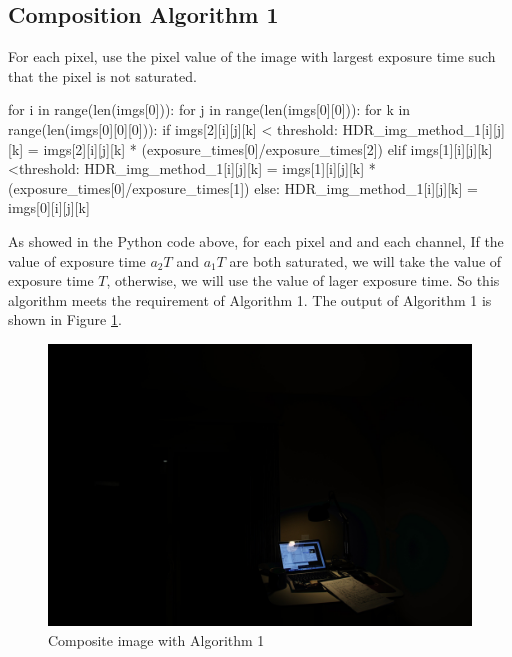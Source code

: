 \documentclass[10pt,twocolumn,letterpaper]{article}
\begin{document}
\subsection{Composition Algorithm 1}
For each pixel, use the pixel value of the image with largest exposure time such that the pixel is not saturated. \\

\begin{python}
for i in  range(len(imgs[0])):
	for j in range(len(imgs[0][0])):
		for k in range(len(imgs[0][0][0])):
			if imgs[2][i][j][k] < threshold:
				HDR_img_method_1[i][j][k] 
				= imgs[2][i][j][k] * 
				(exposure_times[0]/exposure_times[2])
			elif imgs[1][i][j][k] <threshold:
				HDR_img_method_1[i][j][k] 
				= imgs[1][i][j][k] * 
				(exposure_times[0]/exposure_times[1])
			else:
				HDR_img_method_1[i][j][k] 
				= imgs[0][i][j][k]
\end{python}

As showed in the Python code above, for each pixel and and each channel, If the value of exposure time $a_{2}T$ and $a_{1}T$ are both saturated, we will take the value of exposure time $T$, otherwise, we will use the value of lager exposure time. So this algorithm meets the requirement of Algorithm 1. The output of Algorithm 1 is shown in Figure \ref{fig:HDR_img_method_1}. 

\begin{figure}[bhp]
\includegraphics[width=\columnwidth]{images/hdr/combined/HDR_img_method_1}
\caption{Composite image with Algorithm 1}

\label{fig:HDR_img_method_1}
\end{figure}
\end{document}
